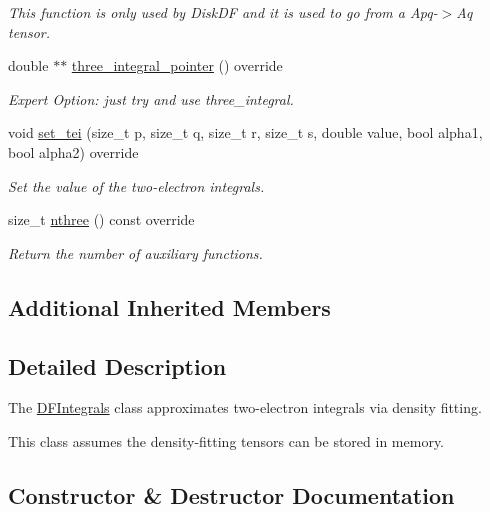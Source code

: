 \begin{DoxyCompactItemize}
\begin{DoxyCompactList}\small\item\em This function is only used by Disk\+DF and it is used to go from a Apq-\/$>$Aq tensor. \end{DoxyCompactList}\item 
double $\ast$$\ast$ \mbox{\hyperlink{classforte_1_1_d_f_integrals_ad682d1f719de96683aa2bc02fc46eabe}{three\+\_\+integral\+\_\+pointer}} () override
\begin{DoxyCompactList}\small\item\em Expert Option\+: just try and use three\+\_\+integral. \end{DoxyCompactList}\item 
void \mbox{\hyperlink{classforte_1_1_d_f_integrals_ac623714d6a85c8f18722aae187b8324e}{set\+\_\+tei}} (size\+\_\+t p, size\+\_\+t q, size\+\_\+t r, size\+\_\+t s, double value, bool alpha1, bool alpha2) override
\begin{DoxyCompactList}\small\item\em Set the value of the two-\/electron integrals. \end{DoxyCompactList}\item 
size\+\_\+t \mbox{\hyperlink{classforte_1_1_d_f_integrals_ac514e780990cdc0b3b594453eb63e901}{nthree}} () const override
\begin{DoxyCompactList}\small\item\em Return the number of auxiliary functions. \end{DoxyCompactList}\end{DoxyCompactItemize}
\subsection*{Additional Inherited Members}


\subsection{Detailed Description}
The \mbox{\hyperlink{classforte_1_1_d_f_integrals}{D\+F\+Integrals}} class approximates two-\/electron integrals via density fitting. 

This class assumes the density-\/fitting tensors can be stored in memory. 

\subsection{Constructor \& Destructor Documentation}
\mbox{\label{classforte_1_1_d_f_integrals_a3475865749b607888cd8306e2d8c1f08}} 
